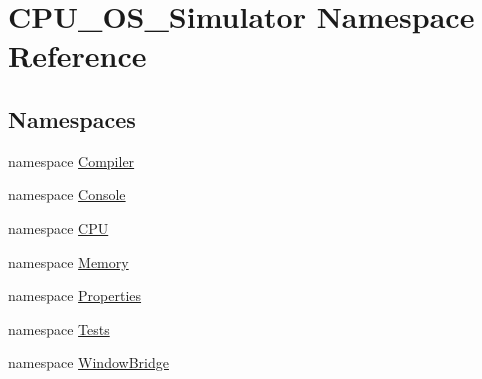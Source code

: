 \hypertarget{namespace_c_p_u___o_s___simulator}{}\section{C\+P\+U\+\_\+\+O\+S\+\_\+\+Simulator Namespace Reference}
\label{namespace_c_p_u___o_s___simulator}
\subsection*{Namespaces}
\begin{DoxyCompactItemize}
\item 
namespace \hyperlink{namespace_c_p_u___o_s___simulator_1_1_compiler}{Compiler}
\item 
namespace \hyperlink{namespace_c_p_u___o_s___simulator_1_1_console}{Console}
\item 
namespace \hyperlink{namespace_c_p_u___o_s___simulator_1_1_c_p_u}{C\+P\+U}
\item 
namespace \hyperlink{namespace_c_p_u___o_s___simulator_1_1_memory}{Memory}
\item 
namespace \hyperlink{namespace_c_p_u___o_s___simulator_1_1_properties}{Properties}
\item 
namespace \hyperlink{namespace_c_p_u___o_s___simulator_1_1_tests}{Tests}
\item 
namespace \hyperlink{namespace_c_p_u___o_s___simulator_1_1_window_bridge}{Window\+Bridge}
\end{DoxyCompactItemize}
